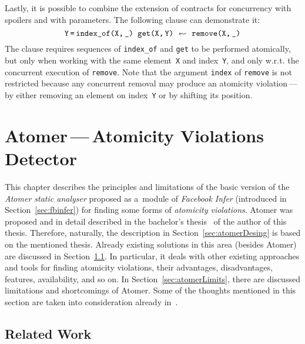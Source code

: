 Lastly, it is possible to combine the extension of contracts for concurrency with spoilers and with parameters. The following clause can demonstrate it:
$$
    \text{\texttt{Y\,=\,index\_of(X,\,\_) get(X,\,Y)}}\ \leftsquigarrow\ \text{\texttt{remove(X,\,\_)}}
$$
The clause requires sequences of \texttt{index\_of} and \texttt{get} to be performed atomically, but only when working with the same element~\texttt{X} and index~\texttt{Y}, and only w.r.t. the concurrent execution of \texttt{remove}. Note that the argument \texttt{index} of \texttt{remove} is not restricted because any concurrent removal may produce an atomicity violation\,---\,by either removing an element on index~\texttt{Y} or by shifting its position.






\chapter{\texorpdfstring{Atomer\,---\,Atomicity Violations Detector}{Atomer - Atomicity Violations Detector}}
\label{chap:atomer}

This chapter describes the principles and limitations of the basic version of the \emph{Atomer static analyser} proposed as a~module of \emph{Facebook Infer} (introduced in Section~\ref{sec:fbinfer}) for finding some forms of \emph{atomicity violations}. Atomer was proposed and in detail described in the bachelor's thesis~\cite{harmimBP} of the author of this thesis. Therefore, naturally, the description in Section~\ref{sec:atomerDesing} is based on the mentioned thesis. Already existing solutions in this area (besides Atomer) are discussed in Section~\ref{sec:atomerRelatedWork}. In particular, it deals with other existing approaches and tools for finding atomicity violations, their advantages, disadvantages, features, availability, and so on. In Section~\ref{sec:atomerLimits}, there are discussed limitations and shortcomings of Atomer. Some of the thoughts mentioned in this section are taken into consideration already in~\cite{harmimBP}.


\section{Related Work}
\label{sec:atomerRelatedWork}

